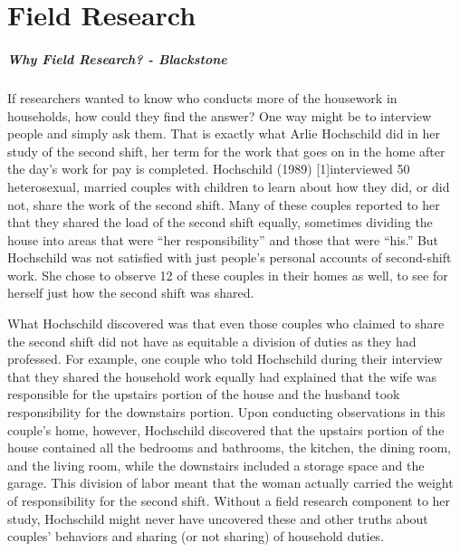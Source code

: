 \chapter{Field Research}\label{ch13:field_research}

\paragraph{Why Field Research? - Blackstone}

If researchers wanted to know who conducts more of the housework in households, how could they find the answer? One way might be to interview people and simply ask them. That is exactly what Arlie Hochschild did in her study of the second shift, her term for the work that goes on in the home after the day’s work for pay is completed. Hochschild (1989) [1]interviewed 50 heterosexual, married couples with children to learn about how they did, or did not, share the work of the second shift. Many of these couples reported to her that they shared the load of the second shift equally, sometimes dividing the house into areas that were ``her responsibility'' and those that were ``his.'' But Hochschild was not satisfied with just people's personal accounts of second-shift work. She chose to observe 12 of these couples in their homes as well, to see for herself just how the second shift was shared.

What Hochschild discovered was that even those couples who claimed to share the second shift did not have as equitable a division of duties as they had professed. For example, one couple who told Hochschild during their interview that they shared the household work equally had explained that the wife was responsible for the upstairs portion of the house and the husband took responsibility for the downstairs portion. Upon conducting observations in this couple's home, however, Hochschild discovered that the upstairs portion of the house contained all the bedrooms and bathrooms, the kitchen, the dining room, and the living room, while the downstairs included a storage space and the garage. This division of labor meant that the woman actually carried the weight of responsibility for the second shift. Without a field research component to her study, Hochschild might never have uncovered these and other truths about couples' behaviors and sharing (or not sharing) of household duties.

